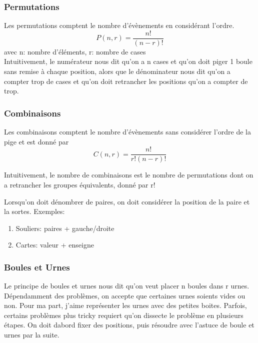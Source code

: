 \documentclass{article}
\begin{document}
\subsubsection{Permutations}%
\label{ssub:permutations}

Les permutations comptent le nombre d'évènements en considérant l'ordre.
$$ P(n,r) = \frac{n!}{(n-r)!} $$ avec n: nombre d'éléments, r: nombre de cases\\

Intuitivement, le numérateur nous dit qu'on a n cases et qu'on doit piger
1 boule sans remise à chaque position, alors que le dénominateur nous dit
qu'on a compter trop de cases et qu'on doit retrancher les positions qu'on
a compter de trop.

\subsubsection{Combinaisons}%
\label{ssub:combinaisons}

Les combinaisons comptent le nombre d'évènements sans considérer l'ordre
de la pige et est donné par
$$ C(n,r) = \frac{n!}{r! (n-r)!} $$

Intuitivement, le nombre de combinaisons est le nombre de permutations dont
on a retrancher les groupes équivalents, donné par r!

\begin{problem}
    Lorsqu'on doit dénombrer de paires, on doit considérer la position de la
    paire et la sortes. Exemples:
    \begin{enumerate}
        \item Souliers: paires + gauche/droite
	\item Cartes: valeur + enseigne
    \end{enumerate}
\end{problem}

\subsubsection{Boules et Urnes}%
\label{ssub:boules_et_urnes}

Le principe de boules et urnes nous dit qu'on veut placer n boules dans r
urnes. Dépendamment des problèmes, on accepte que certaines urnes soients
vides ou non. Pour ma part, j'aime représenter les urnes avec des petites
boites. Parfois, certains problèmes plus tricky requiert qu'on dissecte
le problème en plusieurs étapes. On doit dabord fixer des positions, puis
résoudre avec l'astuce de boule et urnes par la suite.
\end{document}
